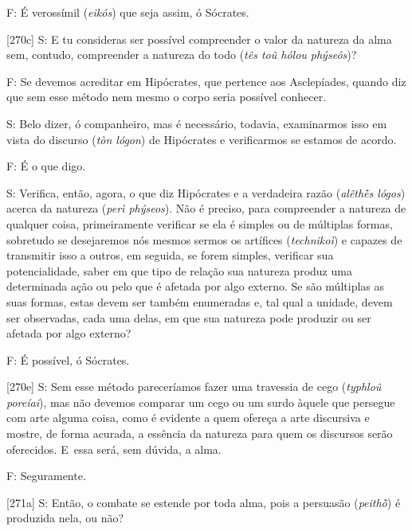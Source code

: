  

F: É verossímil (\emph{eikós}) que seja assim, ó Sócrates.

 

[270c] S: E tu consideras ser possível compreender o valor da
natureza da alma sem, contudo, compreender a natureza do todo (\emph{tês
toû hólou phýseôs})?

 

F: Se devemos acreditar em Hipócrates, que pertence aos Asclepíades,
quando diz que sem esse método nem mesmo o corpo seria possível
conhecer.

 

S: Belo dizer, ó companheiro, mas é necessário, todavia, examinarmos
isso em vista do discurso (\emph{tòn lógon}) de Hipócrates e
verificarmos se estamos de acordo.

 

F: É o que digo.

 

S: Verifica, então, agora, o que diz Hipócrates e a verdadeira razão
(\emph{alêthḕs lógos}) acerca da natureza (\emph{perì phýseos}). Não é
preciso, para compreender a natureza de qualquer coisa, primeiramente
verificar se ela é simples ou de múltiplas formas, sobretudo se
desejaremos nós mesmos sermos os artífices (\emph{technikoì}) e capazes
de transmitir isso a outros, em seguida, se forem simples, verificar sua
potencialidade, saber em que tipo de relação sua natureza produz uma
determinada ação ou pelo que é afetada por algo externo. Se são
múltiplas as suas formas, estas devem ser também enumeradas e, tal qual
a unidade, devem ser observadas, cada uma delas, em que sua natureza
pode produzir ou ser afetada por algo externo?

 

F: É possível, ó Sócrates.

 

[270e] S: Sem esse método pareceríamos fazer uma travessia de cego
(\emph{typhloû poreíai}), mas não devemos comparar um cego ou um surdo
àquele que persegue com arte alguma coisa, como é evidente a quem
ofereça a arte discursiva e mostre, de forma acurada, a essência da
natureza para quem os discursos serão oferecidos. E~essa será, sem
dúvida, a alma.

 

F: Seguramente.

 

[271a] S: Então, o combate se estende por toda alma, pois a
persuasão (\emph{peithṑ}) é produzida nela, ou não?

